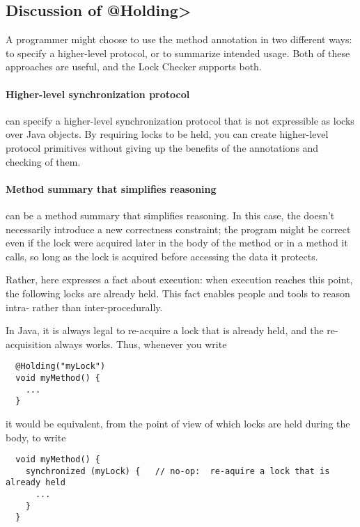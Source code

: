 \subsection{Discussion of \<@Holding>}

A programmer might choose to use the  method annotation in
two different ways:  to specify a higher-level protocol, or to summarize
intended usage.  Both of these approaches are useful, and the Lock Checker
supports both.

\paragraph{Higher-level synchronization protocol}

   can specify a higher-level synchronization protocol that
  is not expressible as locks over Java objects.  By requiring locks to be
  held, you can create higher-level protocol primitives without giving up
  the benefits of the annotations and checking of them.

\paragraph{Method summary that simplifies reasoning}

   can be a method summary that simplifies reasoning.  In
  this case, the  doesn't necessarily introduce a new
  correctness constraint; the program might be correct even if the lock
  were acquired later in the body of the method or in a method it calls, so
  long as the lock is acquired before accessing the data it protects.

  Rather, here  expresses a fact about execution:  when
  execution reaches this point, the following locks are already held.  This
  fact enables people and tools to reason intra- rather than
  inter-procedurally.

  In Java, it is always legal to re-acquire a lock that is already held,
  and the re-acquisition always works.  Thus, whenever you write 

\begin{Verbatim}
  @Holding("myLock")
  void myMethod() {
    ...
  }
\end{Verbatim}

\noindent
it would be equivalent, from the point of view of which locks are held
during the body, to write

\begin{Verbatim}
  void myMethod() {
    synchronized (myLock) {   // no-op:  re-aquire a lock that is already held
      ...
    }
  }
\end{Verbatim}

